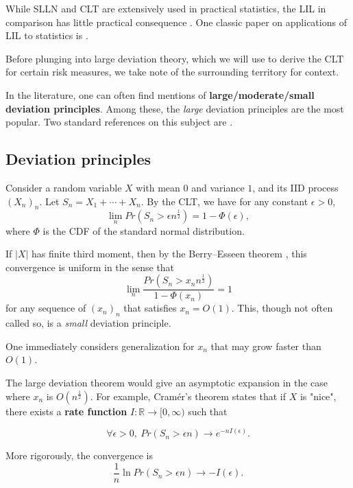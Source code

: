 While SLLN and CLT are extensively used in practical statistics, the LIL in comparison has little practical consequence \cite{vandervaartAsymptoticStatistics2000}. One classic paper on applications of LIL to statistics is \cite{robbinsStatisticalMethodsRelated1970}.

Before plunging into large deviation theory, which we will use to derive the CLT for certain risk measures, we take note of the surrounding territory for context.

In the literature, one can often find mentions of \textbf{large/moderate/small deviation principles}. Among these, the \textit{large} deviation principles are the most popular. Two standard references on this subject are \cite{demboLargeDeviationsTechniques2009, denhollanderLargeDeviations2008}.

\subsection{Deviation principles}
Consider a random variable $X$ with mean $0$ and variance $1$, and its IID process $(X_n)_n$. Let $S_n = X_1 + \cdots + X_n$. By the CLT, we have for any constant $\epsilon > 0$, 
\begin{equation}
\lim_n Pr(S_n > \epsilon n^{\frac 1 2}) = 1 - \Phi(\epsilon),
\end{equation}
where $\Phi$ is the CDF of the standard normal distribution.

If $|X|$ has finite third moment, then by the Berry--Esseen theorem \cite[Theorem 3.4.9]{durrettProbabilityTheoryExamples2010}, this convergence is uniform in the sense that 
\begin{equation}
\lim_n \frac {Pr(S_n > x_n n^{\frac 1 2})}  {1 - \Phi(x_n)} = 1
\end{equation}
for any sequence of $(x_n)_n$ that satisfies $x_n = O(1)$. This, though not often called so, is a \textit{small} deviation principle.

One immediately considers generalization for $x_n$ that may grow faster than $O(1)$. 

The large deviation theorem would give an asymptotic expansion in the case where $x_n$ is $O(n^{\frac 1 2})$. For example, Cram\'er's theorem states that if $X$ is "nice", there exists a \textbf{rate function} $I : \mathbb{R} \to [0, \infty)$ such that 

$$\forall \epsilon > 0, \: 
Pr(S_n > \epsilon n) \to e^{-nI(\epsilon)}.$$

More rigorously, the convergence is 
\begin{equation}
\frac 1 n \ln Pr(S_n > \epsilon n) \to -I(\epsilon).
\end{equation}

